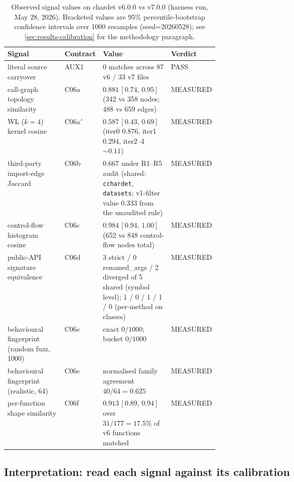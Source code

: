 \documentclass[11pt,letterpaper]{article}
\begin{document}
\begin{table}[h]
\small
\centering
\caption{Observed signal values on chardet v6.0.0 vs v7.0.0
(harness run, May 28, 2026). Bracketed values are 95\%
percentile-bootstrap confidence intervals over 1000 resamples
(seed=20260528); see \cref{sec:results-calibration} for the
methodology paragraph.}
\label{tab:results}
\begin{tabularx}{\linewidth}{@{}>{\raggedright\arraybackslash}p{0.27\linewidth}p{0.09\linewidth}Xp{0.13\linewidth}@{}}
\toprule
Signal & Contract & Value & Verdict \\
\midrule
literal source carryover &
  AUX1 &
  0 matches across 87 v6 / 33 v7 files &
  PASS \\
call-graph topology similarity &
  C06a &
  $0.881\,[0.74,\,0.95]$ (342 vs 358 nodes; 488 vs 659 edges) &
  MEASURED \\
WL ($k{=}4$) kernel cosine &
  C06a$'$ &
  $0.587\,[0.43,\,0.69]$ (iter0 $0.876$, iter1 $0.294$, iter2--4 $\sim 0.11$) &
  MEASURED \\
third-party import-edge Jaccard &
  C06b &
  $0.667$ under R1--R5 audit (shared: \texttt{cchardet}, \texttt{datasets}; v1-filter value $0.333$ from the unaudited rule) &
  MEASURED \\
control-flow histogram cosine &
  C06c &
  $0.984\,[0.94,\,1.00]$ (652 vs 848 control-flow nodes total) &
  MEASURED \\
public-API signature equivalence &
  C06d &
  3 strict / 0 renamed\_args / 2 diverged of 5 shared (symbol level); 1 / 0 / 1 / 1 / 0 (per-method on classes) &
  MEASURED \\
behavioural fingerprint (random fuzz, 1000) &
  C06e &
  exact $0/1000$; bucket $0/1000$ &
  MEASURED \\
behavioural fingerprint (realistic, 64) &
  C06e &
  normalised family agreement $40/64=0.625$ &
  MEASURED \\
per-function shape similarity &
  C06f &
  $0.913\,[0.89,\,0.94]$ over $31/177=17.5\%$ of v6 functions matched &
  MEASURED \\
\bottomrule
\end{tabularx}
\end{table}

\subsection{Interpretation: read each signal against its calibration}
\label{sec:interpretation}
\end{document}
